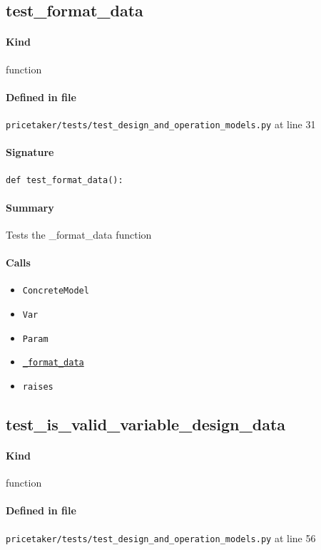 \documentclass[11pt]{report}
\begin{document}
\subsection{test\_format\_data}
\label{def:pricetaker-tests-test_design_and_operation_models.py:test_format_data:L31}
\paragraph{Kind} function
\paragraph{Defined in file} \texttt{pricetaker/tests/test\_design\_and\_operation\_models.py} at line 31
\paragraph{Signature} \texttt{def test\_format\_data():}
\paragraph{Summary} Tests the \_format\_data function
\paragraph{Calls}
\begin{itemize}[leftmargin=*]
  \item \texttt{ConcreteModel}
  \item \texttt{Var}
  \item \texttt{Param}
  \item \hyperref[def:pricetaker-design_and_operation_models.py:_format_data:L30]{\texttt{\_format\_data}}
  \item \texttt{raises}
\end{itemize}
\subsection{test\_is\_valid\_variable\_design\_data}
\label{def:pricetaker-tests-test_design_and_operation_models.py:test_is_valid_variable_design_data:L56}
\paragraph{Kind} function
\paragraph{Defined in file} \texttt{pricetaker/tests/test\_design\_and\_operation\_models.py} at line 56
\end{document}
